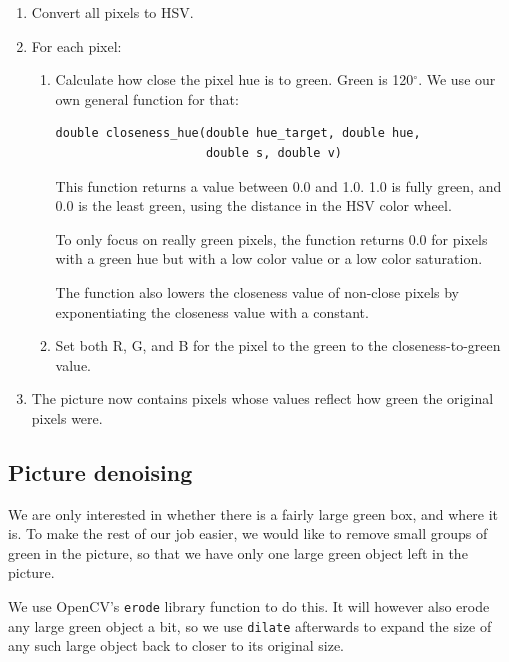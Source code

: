 \documentclass[a4paper,12pt]{article}
\begin{document}
\begin{enumerate}
\item

Convert all pixels to HSV.

\item

For each pixel:

\begin{enumerate}
\item

Calculate how close the pixel hue is to green.  Green is 120$^{\circ}$.  We use
our own general function for that:

\begin{verbatim}
double closeness_hue(double hue_target, double hue, 
                     double s, double v)
\end{verbatim}

This function returns a value between 0.0 and 1.0.  1.0 is fully green, and 0.0
is the least green, using the distance in the HSV color wheel.

To only focus on really green pixels, the function returns 0.0 for pixels with a
green hue but with a low color value or a low color saturation.

The function also lowers the closeness value of non-close pixels by
exponentiating the closeness value with a constant.

\item Set both R, G, and B for the pixel to the green to the closeness-to-green
value.

\end{enumerate}
\item The picture now contains pixels whose values reflect how green the
original pixels were.
\end{enumerate}


\subsection{Picture denoising}

We are only interested in whether there is a fairly large green box, and where
it is.  To make the rest of our job easier, we would like to remove small groups
of green in the picture, so that we have only one large green object left in the
picture.

We use OpenCV's \texttt{erode} library function to do this.  It will however
also erode any large green object a bit, so we use \texttt{dilate} afterwards to
expand the size of any such large object back to closer to its original size.
\end{document}
